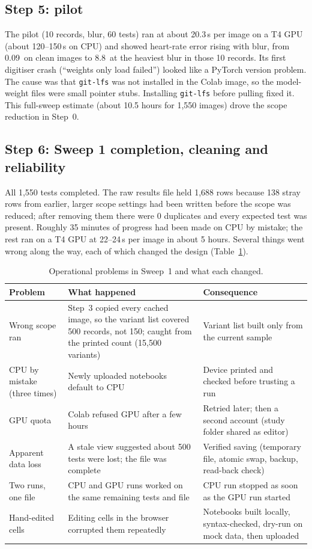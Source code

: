 \subsection{Step 5: pilot}
The pilot (10 records, blur, 60 tests) ran at about 20.3\,s per image on a T4 GPU (about 120--150\,s on CPU) and showed heart-rate error rising with blur, from 0.09\bpm\ on clean images to 8.8\bpm\ at the heaviest blur in those 10 records. Its first digitiser crash (``weights only load failed'') looked like a PyTorch version problem. The cause was that \texttt{git-lfs} was not installed in the Colab image, so the model-weight files were small pointer stubs. Installing \texttt{git-lfs} before pulling fixed it. This full-sweep estimate (about 10.5 hours for 1{,}550 images) drove the scope reduction in Step~0.

\subsection{Step 6: Sweep 1 completion, cleaning and reliability}\label{sec:cleaning}
All 1{,}550 tests completed. The raw results file held 1{,}688 rows because 138 stray rows from earlier, larger scope settings had been written before the scope was reduced; after removing them there were 0 duplicates and every expected test was present. Roughly 35 minutes of progress had been made on CPU by mistake; the rest ran on a T4 GPU at 22--24\,s per image in about 5 hours. Several things went wrong along the way, each of which changed the design (Table~\ref{tab:problems}).

\begin{table}[ht]
\centering\small
\caption{Operational problems in Sweep~1 and what each changed.}\label{tab:problems}
\begin{tabularx}{\textwidth}{@{}>{\raggedright\arraybackslash}p{3.6cm}>{\raggedright\arraybackslash}X>{\raggedright\arraybackslash}p{4.4cm}@{}}
\toprule
Problem & What happened & Consequence \\
\midrule
Wrong scope ran & Step~3 copied every cached image, so the variant list covered 500 records, not 150; caught from the printed count (15{,}500 variants) & Variant list built only from the current sample \\
CPU by mistake (three times) & Newly uploaded notebooks default to CPU & Device printed and checked before trusting a run \\
GPU quota & Colab refused GPU after a few hours & Retried later; then a second account (study folder shared as editor) \\
Apparent data loss & A stale view suggested about 500 tests were lost; the file was complete & Verified saving (temporary file, atomic swap, backup, read-back check) \\
Two runs, one file & CPU and GPU runs worked on the same remaining tests and file & CPU run stopped as soon as the GPU run started \\
Hand-edited cells & Editing cells in the browser corrupted them repeatedly & Notebooks built locally, syntax-checked, dry-run on mock data, then uploaded \\
\bottomrule
\end{tabularx}
\end{table}

